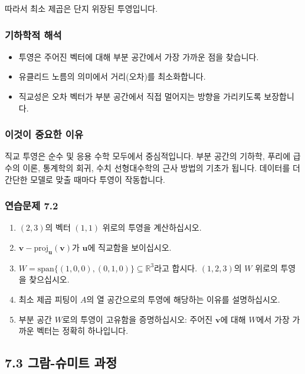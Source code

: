 \documentclass[
  12pt,
  a4paper,
]{article}
\begin{document}
따라서 최소 제곱은 단지 위장된 투영입니다.

\subsubsection{기하학적 해석}\label{geometric-interpretation-14}

\begin{itemize}
\item
  투영은 주어진 벡터에 대해 부분 공간에서 가장 가까운 점을 찾습니다.
\item
  유클리드 노름의 의미에서 거리(오차)를 최소화합니다.
\item
  직교성은 오차 벡터가 부분 공간에서 직접 멀어지는 방향을 가리키도록 보장합니다.
\end{itemize}

\subsubsection{이것이 중요한 이유}\label{why-this-matters-25}

직교 투영은 순수 및 응용 수학 모두에서 중심적입니다. 부분 공간의 기하학, 푸리에 급수의 이론, 통계학의 회귀, 수치 선형대수학의 근사 방법의 기초가 됩니다. 데이터를 더 간단한 모델로 맞출 때마다 투영이 작동합니다.

\subsubsection{연습문제 7.2}\label{exercises-72}

\begin{enumerate}
\def\labelenumi{\arabic{enumi}.}
\item
  \((2,3)\)의 벡터 \((1,1)\) 위로의 투영을 계산하십시오.
\item
  \(\mathbf{v} - \text{proj}_{\mathbf{u}}(\mathbf{v})\)가 \(\mathbf{u}\)에 직교함을 보이십시오.
\item
  \(W = \text{span}\{(1,0,0), (0,1,0)\} \subseteq \mathbb{R}^3\)라고 합시다. \((1,2,3)\)의 \(W\) 위로의 투영을 찾으십시오.
\item
  최소 제곱 피팅이 \(A\)의 열 공간으로의 투영에 해당하는 이유를 설명하십시오.
\item
  부분 공간 \(W\)로의 투영이 고유함을 증명하십시오: 주어진 \(\mathbf{v}\)에 대해 \(W\)에서 가장 가까운 벡터는 정확히 하나입니다.
\end{enumerate}

\subsection{7.3 그람-슈미트 과정}\label{73-gram--schmidt-process}
\end{document}
